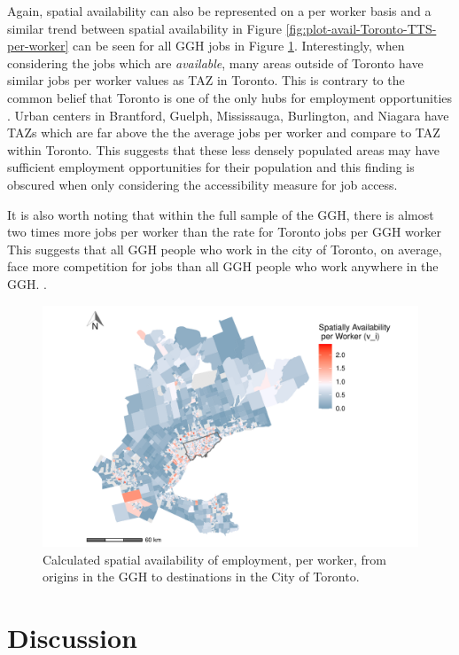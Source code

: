 \documentclass[]{elsarticle} %
\begin{document}
Again, spatial availability can also be represented on a per worker
basis and a similar trend between spatial availability in Figure
\ref{fig:plot-avail-Toronto-TTS-per-worker} can be seen for all GGH jobs
in Figure \ref{fig:plot-avail-GGH-TTS-per-worker}. Interestingly, when
considering the jobs which are \emph{available}, many areas outside of
Toronto have similar jobs per worker values as TAZ in Toronto. This is
contrary to the common belief that Toronto is one of the only hubs for
employment opportunities . Urban centers in Brantford, Guelph,
Mississauga, Burlington, and Niagara have TAZs which are far above the
the average jobs per worker and compare to TAZ within Toronto. This
suggests that these less densely populated areas may have sufficient
employment opportunities for their population and this finding is
obscured when only considering the accessibility measure for job access.

It is also worth noting that within the full sample of the GGH, there is
almost two times more jobs per worker than the rate for Toronto jobs per
GGH worker This suggests that all GGH people who work in the city of
Toronto, on average, face more competition for jobs than all GGH people
who work anywhere in the GGH. .

\begin{figure}
\includegraphics[width=1\linewidth]{Spatial-Availability_files/figure-latex/plot-avail-GGH-TTS-per-worker-1} \caption{\label{fig:plot-avail-GGH-TTS-per-worker}Calculated spatial availability of employment, per worker, from origins in the GGH to destinations in the City of Toronto.}\label{fig:plot-avail-GGH-TTS-per-worker}
\end{figure}
\newpage

\hypertarget{discussion}{%
\section{Discussion}\label{discussion}}
\end{document}
